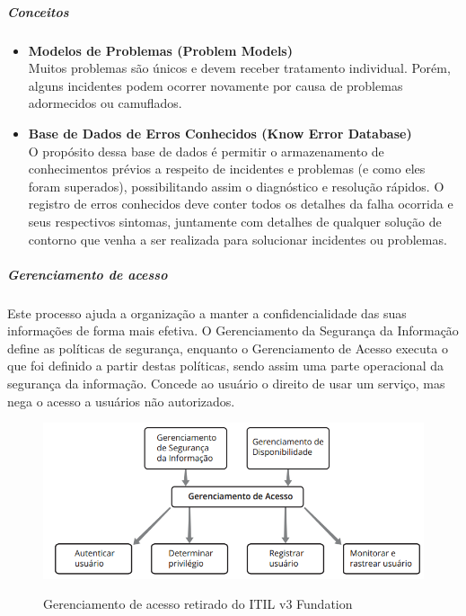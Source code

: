 \subparagraph*{Conceitos}
\begin{itemize}[noitemsep]
	\item {\bfseries Modelos de Problemas (Problem Models)} \\
		Muitos problemas são únicos e devem receber tratamento individual. Porém, alguns incidentes 				podem ocorrer novamente por causa de problemas adormecidos ou camuflados.
	\item {\bfseries Base de Dados de Erros Conhecidos (Know Error Database) } \\
		O propósito dessa base de dados é permitir o armazenamento de conhecimentos prévios a
	respeito de incidentes e problemas (e como eles foram superados), possibilitando assim o
	diagnóstico e resolução rápidos. O registro de erros conhecidos deve conter todos os detalhes da 		falha ocorrida e seus respectivos sintomas, juntamente com detalhes de qualquer solução de contorno 		que venha a ser realizada para solucionar incidentes ou problemas.
\end{itemize}





\subparagraph{Gerenciamento de acesso}

Este processo ajuda a organização a manter a confidencialidade das suas informações de
forma mais efetiva. O Gerenciamento da Segurança da Informação define as políticas de
segurança, enquanto o Gerenciamento de Acesso executa o que foi definido a partir destas
políticas, sendo assim uma parte operacional da segurança da informação.
Concede ao usuário o direito de usar um serviço, mas nega o acesso a usuários não autorizados.

\begin{figure}[!h]
\caption{Gerenciamento de acesso retirado do ITIL v3 Fundation}
\centering %
\includegraphics[width=15cm]{itil_images/gerenciamento_de_acesso.png}
\label{figura:Gerenciamento de acesso retirado do ITIL v3 Fundation}
\end{figure}

